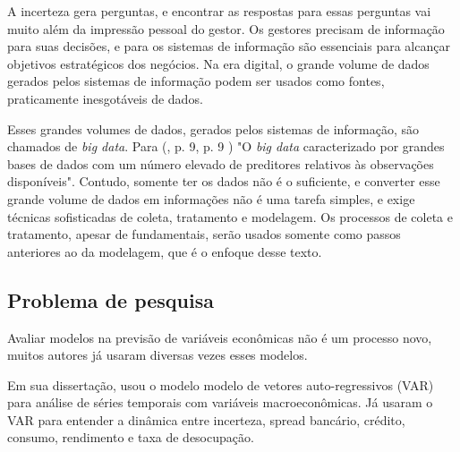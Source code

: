 \documentclass[12pt]{article}%
\newcommand{\citem}[2][]{%
	(\citeauthoronline{#2}, \citeyear{#2}%
	\ifx#1\empty\else, #1\fi%
	)%
}
\begin{document}
	
	A incerteza 
	gera perguntas, e encontrar as respostas para essas perguntas vai muito além da impressão pessoal
	do gestor. Os gestores precisam de informação para suas decisões, e para  os sistemas de informação são essenciais para alcançar objetivos estratégicos dos negócios. Na era digital, o grande volume de dados gerados pelos sistemas de informação podem ser usados como fontes, praticamente inesgotáveis de dados.
	
	Esses grandes volumes de dados, gerados pelos sistemas de informação, são chamados de \textit{big data}. Para \citem[p. 9]{vasconcelos2017poder}  "O \textit{big data} caracterizado por grandes bases de dados com um número elevado de preditores relativos às observações disponíveis". Contudo, somente ter os dados não é o suficiente, e converter esse grande volume de dados em informações não é uma tarefa simples, e exige técnicas sofisticadas de coleta, tratamento e modelagem. Os processos de coleta e tratamento, apesar de fundamentais, serão usados somente como passos anteriores ao da modelagem, que é o enfoque  desse texto.  
	
	
	
	 

	

	
	
	
	
	
	
	
	
	
	
	
	\subsection{Problema de pesquisa}
	
	Avaliar modelos na previsão de variáveis econômicas não é um processo novo, muitos autores já usaram diversas vezes esses modelos.
	
	Em sua dissertação,  usou o modelo modelo de vetores auto-regressivos (VAR) para análise de séries temporais com variáveis macroeconômicas.
	Já  usaram o VAR para entender a dinâmica entre 
	incerteza, spread bancário, crédito, consumo, rendimento e taxa de desocupação. 
	
\end{document}

